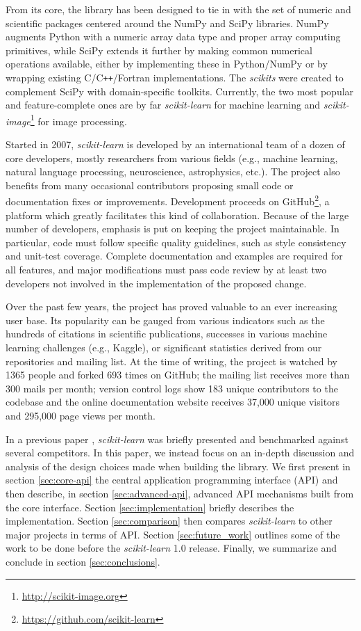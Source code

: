 \documentclass{llncs}
\newcommand{\sklearn}{\textit{scikit-learn}\xspace}
\begin{document}
From its core, the library has been designed to tie in with the set of numeric
and scientific packages centered around the NumPy and SciPy libraries. NumPy
\citep{vanderwalt2011} augments Python with a numeric array data type and proper
array computing primitives, while SciPy \citep{varoquaux2013scipy} extends it
further by making common numerical operations available, either by implementing
these in Python/NumPy or by wrapping existing C/C{}\verb!++!/Fortran
implementations. The \textit{scikits} were created to complement SciPy with
domain-specific toolkits. Currently, the two most popular and feature-complete
ones are by far \sklearn for machine learning and 
\textit{scikit-image}\footnote{\url{http://scikit-image.org}} for image
processing.

Started in 2007, \sklearn is developed by an international team of a dozen of
core developers, mostly researchers from various fields (e.g., machine learning,
natural language processing, neuroscience, astrophysics, etc.). The project also benefits
from many occasional contributors proposing small code or documentation fixes or
improvements. Development proceeds on GitHub\footnote{\url{https://github.com/scikit-learn}},
a platform which greatly facilitates this kind of
collaboration. Because of the large number of developers, emphasis is
put on keeping the project maintainable. In particular, code must follow
specific quality guidelines, such as style consistency and unit-test coverage.
Complete documentation and examples are required for all features,
and major modifications must pass code review by at least two
developers not involved in the implementation of the proposed change.

Over the past few years, the project has proved valuable to an ever increasing
user base. Its popularity can be gauged from various indicators such as the hundreds
of citations in scientific publications, successes in various machine learning
challenges (e.g., Kaggle), or significant statistics derived from our
repositories and mailing list.  At the time of writing, the project is watched
by 1365 people and forked 693 times on GitHub; the mailing list receives more
than 300 mails per month; version control logs
show 183 unique contributors to the codebase and the online documentation
website receives 37,000 unique visitors and 295,000 page views per month.

In a previous paper \citep{pedregosa2011}, \sklearn was briefly presented and
benchmarked against several competitors. In this paper, we instead focus on an
in-depth discussion and analysis of the design choices made when building the
library. We first present in section \ref{sec:core-api} the central application
programming interface (API) and then describe, in section \ref{sec:advanced-api},
advanced API mechanisms built from the core interface.
Section \ref{sec:implementation} briefly describes the implementation.
Section \ref{sec:comparison} then
compares \sklearn to other major projects in terms of API.
Section \ref{sec:future_work} outlines some of the work to be done before
the \sklearn 1.0 release.
Finally, we summarize and conclude in section \ref{sec:conclusions}.
\end{document}
